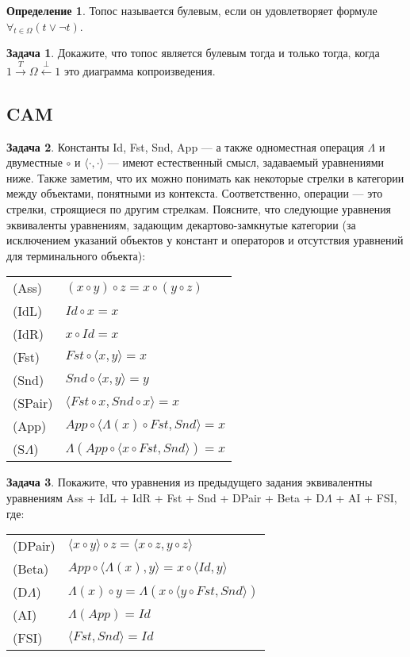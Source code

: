 \documentclass[10pt]{article}
\theoremstyle{definition}
\newtheorem{Def}{Определение}
\newtheorem{Pm}{Задача}[subsection]
\begin{document}
\begin{Def}
    Топос называется булевым, если он удовлетворяет формуле $\forall_{t\in \Omega}(t \lor \neg t)$.
\end{Def}
\begin{Pm}
    Докажите, что топос является булевым тогда и только тогда, когда
    $1 \overset{T}{\to} \Omega \overset{\bot}{\leftarrow} 1$ это диаграмма копроизведения.
\end{Pm}

\subsection{CAM}
\begin{Pm}
Константы Id, Fst, Snd, App --- а также одноместная операция $\Lambda$ и двуместные $\circ$ и $\langle\cdot,\cdot\rangle$ ---
имеют естественный смысл, задаваемый уравнениями ниже. Также заметим, что их можно понимать как некоторые стрелки 
в категории между объектами, понятными из контекста. Соответственно, операции --- это стрелки, строящиеся по другим стрелкам.
Поясните, что следующие уравнения эквиваленты уравнениям, задающим декартово-замкнутые категории 
(за исключением указаний объектов у констант и операторов и отсутствия уравнений для терминального объекта):
\vspace{0.3cm}

\begin{tabular}{ll}
(Ass) & $(x \circ y) \circ z = x \circ (y \circ z)$\\
(IdL) & $Id \circ x = x$\\
(IdR) & $x \circ Id = x$\\
(Fst) & $Fst \circ \langle x,y \rangle = x$\\
(Snd) & $Snd \circ \langle x,y \rangle = y$\\
(SPair) & $\langle Fst \circ x, Snd \circ x \rangle = x$\\
(App) & $App \circ \langle \Lambda(x) \circ Fst, Snd \rangle = x$\\
(S$\Lambda$) & $\Lambda(App \circ \langle x \circ Fst, Snd \rangle) = x$
\end{tabular}
\end{Pm}

\begin{Pm}
Покажите, что уравнения из предыдущего задания эквивалентны уравнениям Ass + IdL + IdR + Fst + Snd + DPair + Beta + D$\Lambda$ + AI + FSI, где:
\vspace{0.3cm}

\begin{tabular}{ll}
(DPair) & $\langle x \circ y \rangle \circ z = \langle x \circ z, y \circ z \rangle$\\
(Beta) & $App \circ \langle \Lambda(x), y \rangle = x \circ \langle Id, y \rangle$\\
(D$\Lambda$) & $\Lambda(x) \circ y = \Lambda(x \circ \langle y \circ Fst, Snd\rangle)$\\
(AI) & $\Lambda(App) = Id$\\
(FSI) & $\langle Fst, Snd \rangle = Id$
\end{tabular}

\end{Pm}
\end{document}
